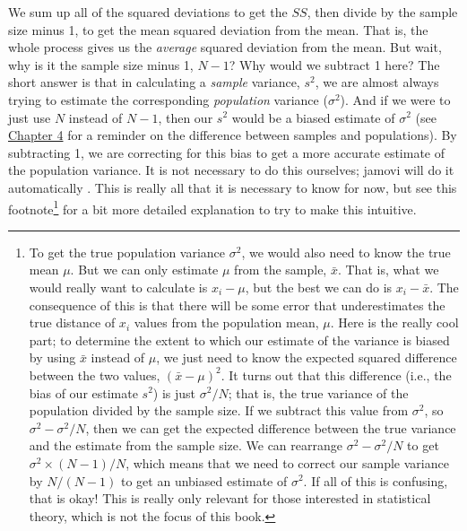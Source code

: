\documentclass[
]{scrbook}
\begin{document}
We sum up all of the squared deviations to get the \(SS\), then divide by the sample size minus 1, to get the mean squared deviation from the mean.
That is, the whole process gives us the \emph{average} squared deviation from the mean.
But wait, why is it the sample size minus 1, \(N - 1\)?
Why would we subtract 1 here?
The short answer is that in calculating a \emph{sample} variance, \(s^{2}\), we are almost always trying to estimate the corresponding \emph{population} variance (\(\sigma^{2}\)).
And if we were to just use \(N\) instead of \(N - 1\), then our \(s^{2}\) would be a biased estimate of \(\sigma^{2}\) (see \protect\hyperlink{Chapter_4}{Chapter 4} for a reminder on the difference between samples and populations).
By subtracting 1, we are correcting for this bias to get a more accurate estimate of the population variance.
It is not necessary to do this ourselves; jamovi will do it automatically \citep{Jamovi2022}.
This is really all that it is necessary to know for now, but see this footnote\footnote{To get the true population variance \(\sigma^{2}\), we would also need to know the true mean \(\mu\). But we can only estimate \(\mu\) from the sample, \(\bar{x}\). That is, what we would really want to calculate is \(x_{i} - \mu\), but the best we can do is \(x_{i} - \bar{x}\). The consequence of this is that there will be some error that underestimates the true distance of \(x_{i}\) values from the population mean, \(\mu\). Here is the really cool part; to determine the extent to which our estimate of the variance is biased by using \(\bar{x}\) instead of \(\mu\), we just need to know the expected squared difference between the two values, \((\bar{x} - \mu)^{2}\). It turns out that this difference (i.e., the bias of our estimate \(s^{2}\)) is just \(\sigma^{2} / N\); that is, the true variance of the population divided by the sample size. If we subtract this value from \(\sigma^{2}\), so \(\sigma^{2} - \sigma^{2}/N\), then we can get the expected difference between the true variance and the estimate from the sample size. We can rearrange \(\sigma^{2} - \sigma^{2}/N\) to get \(\sigma^{2} \times (N - 1)/N\), which means that we need to correct our sample variance by \(N / (N-1)\) to get an unbiased estimate of \(\sigma^{2}\). If all of this is confusing, that is okay! This is really only relevant for those interested in statistical theory, which is not the focus of this book.} for a bit more detailed explanation to try to make this intuitive.
\end{document}
